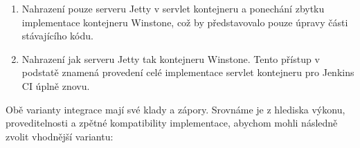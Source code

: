             \begin{enumerate}
                \item{Nahrazení pouze serveru Jetty v servlet kontejneru a ponechání
                    zbytku implementace kontejneru Winstone, což by představovalo
                    pouze úpravy části stávajícího kódu. }

                \item{Nahrazení jak serveru Jetty tak kontejneru Winstone. 
                    Tento přístup v podstatě znamená provedení celé implementace
                    servlet kontejneru pro Jenkins CI úplně znovu.}
            \end{enumerate}

            \noindent Obě varianty integrace mají své klady a zápory. 
            Srovnáme je z hlediska výkonu, proveditelnosti a zpětné kompatibility
            implementace, abychom mohli následně zvolit vhodnější variantu:

